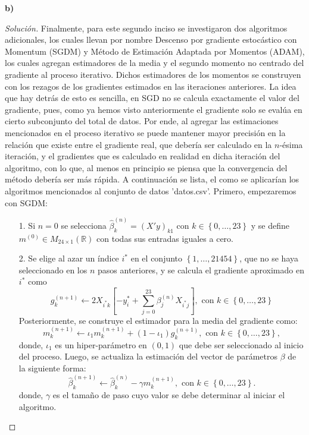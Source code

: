\documentclass[10.5pt,notitlepage]{article}
\newenvironment{solucion}
  {\begin{proof}[Solución]}
  {\end{proof}}
\newcommand{\RR}{\mathbb{R}}
\newcommand{\corch}[1]{\left[ #1 \right]}
\newcommand{\kis}[1]{\left\{ #1 \right\}}
\theoremstyle{plain}
\begin{document}
\textbf{b)}
\begin{solucion}
Finalmente, para este segundo inciso se investigaron dos algoritmos adicionales, los cuales llevan por nombre Descenso por gradiente estocástico con Momentum (SGDM) y Método de Estimación Adaptada por Momentos (ADAM), los cuales agregan estimadores de la media y el segundo momento no centrado del gradiente al proceso iterativo. Dichos estimadores de los momentos se construyen con los rezagos de los gradientes estimados en las iteraciones anteriores. La idea que hay detrás de esto es sencilla, en SGD no se calcula exactamente el valor del gradiente, pues, como ya hemos visto anteriormente el gradiente solo se evalúa en cierto subconjunto del total de datos. Por ende, al agregar las estimaciones mencionados en el proceso iterativo se puede mantener mayor precisión en la relación que existe entre el gradiente real, que debería ser calculado en la \(n\)-ésima iteración, y el gradientes que es calculado en realidad en dicha iteración del algoritmo, con lo que, al menos en principio se piensa que la convergencia del método debería ser más rápida. A continuación se lista, el como se aplicarían los algoritmos mencionados al conjunto de datos 'datos.csv'. Primero, empezaremos con SGDM: 
\begin{itemize}
    \item[1.] Si \(n =0\) se selecciona \(\hat{\beta}_{k}^{(n)} = (X'y)_{k1}\) con \(k \in \kis{0, \hdots, 23}\) y se define \(m^{(0)} \in M_{24\times 1}(\RR)\) con todas sus entradas iguales a cero.
    \item[2.] Se elige al azar un índice \(i^*\) en el conjunto \(\kis{1,\hdots,21454}\), que no se haya seleccionado en los \(n\) pasos anteriores, y 
    se calcula el gradiente aproximado en \(i^*\) como 
    \[
    g_{k}^{(n+1)} \leftarrow 2X_{i^*k}\corch{- y_i^* + \sum_{j = 0}^{23}\beta_{j}^{(n)}X_{i^*j}}, \text{ con } k \in \kis{0, \hdots,23}
    \]
    Posteriormente, se construye el estimador para la media del gradiente como: 
    \[
    m_{k}^{(n+1)} \leftarrow \iota_1 m_k^{(n+1)} + (1 -\iota_1)g_{k}^{(n+1)}, \text{ con } k \in \kis{0, \hdots,23},
    \]
    donde, \(\iota_1\) es un hiper-parámetro en \((0,1)\) que debe ser seleccionado al inicio del proceso. Luego, se actualiza la estimación del vector de parámetros \(\beta\) de la siguiente forma:
    \[
      \hat{\beta}_{k}^{(n+1)} \leftarrow \hat{\beta}_{k}^{(n)} - \gamma m_{k}^{(n+1)}, \text{ con } k \in \kis{0, \hdots,23}.
    \]
    donde, \(\gamma\) es el tamaño de paso cuyo valor se debe determinar al iniciar el algoritmo.

\end{itemize}
\end{solucion}
\end{document}
